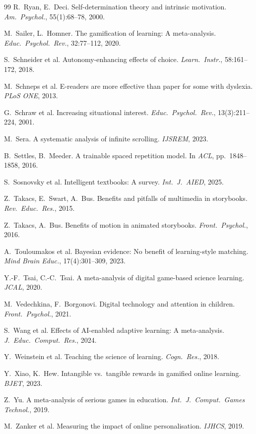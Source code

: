 \documentclass[11pt,a4paper]{article}
\begin{document}
\begin{thebibliography}{99}
 R.~Ryan, E.~Deci. Self-determination theory and intrinsic motivation. \emph{Am.\ Psychol.}, 55(1):68--78, 2000.

 M.~Sailer, L.~Homner. The gamification of learning: A meta-analysis. \emph{Educ.\ Psychol.\ Rev.}, 32:77--112, 2020.

 S.~Schneider et al. Autonomy-enhancing effects of choice. \emph{Learn.\ Instr.}, 58:161--172, 2018.

 M.~Schneps et al. E-readers are more effective than paper for some with dyslexia. \emph{PLoS ONE}, 2013.

 G.~Schraw et al. Increasing situational interest. \emph{Educ.\ Psychol.\ Rev.}, 13(3):211--224, 2001.

 M.~Sera. A systematic analysis of infinite scrolling. \emph{IJSREM}, 2023.

 B.~Settles, B.~Meeder. A trainable spaced repetition model. In \emph{ACL}, pp.\ 1848--1858, 2016.

 S.~Sosnovsky et al. Intelligent textbooks: A survey. \emph{Int.\ J.\ AIED}, 2025.

 Z.~Takacs, E.~Swart, A.~Bus. Benefits and pitfalls of multimedia in storybooks. \emph{Rev.\ Educ.\ Res.}, 2015.

 Z.~Takacs, A.~Bus. Benefits of motion in animated storybooks. \emph{Front.\ Psychol.}, 2016.

 A.~Touloumakos et al. Bayesian evidence: No benefit of learning-style matching. \emph{Mind Brain Educ.}, 17(4):301--309, 2023.

 Y.-F.~Tsai, C.-C.~Tsai. A meta-analysis of digital game-based science learning. \emph{JCAL}, 2020.

 M.~Vedechkina, F.~Borgonovi. Digital technology and attention in children. \emph{Front.\ Psychol.}, 2021.

 S.~Wang et al. Effects of AI-enabled adaptive learning: A meta-analysis. \emph{J.\ Educ.\ Comput.\ Res.}, 2024.

 Y.~Weinstein et al. Teaching the science of learning. \emph{Cogn.\ Res.}, 2018.

 Y.~Xiao, K.~Hew. Intangible vs.\ tangible rewards in gamified online learning. \emph{BJET}, 2023.

 Z.~Yu. A meta-analysis of serious games in education. \emph{Int.\ J.\ Comput.\ Games Technol.}, 2019.

 M.~Zanker et al. Measuring the impact of online personalisation. \emph{IJHCS}, 2019.

\end{thebibliography}
\end{document}
